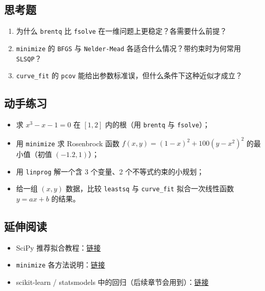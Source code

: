 \subsection{思考题}\label{ux601dux8003ux9898-10}

\begin{enumerate}
\def\labelenumi{\arabic{enumi}.}
\tightlist
\item
  为什么 \texttt{brentq} 比 \texttt{fsolve}
  在一维问题上更稳定？各需要什么前提？
\item
  \texttt{minimize} 的 \texttt{BFGS} 与 \texttt{Nelder-Mead}
  各适合什么情况？带约束时为何常用 \texttt{SLSQP}？
\item
  \texttt{curve\_fit} 的 \texttt{pcov}
  能给出参数标准误，但什么条件下这种近似才成立？
\end{enumerate}

\subsection{动手练习}\label{ux52a8ux624bux7ec3ux4e60-1}

\begin{itemize}
\tightlist
\item
  求 \(x^3-x-1=0\) 在 \([1,2]\) 内的根（用 \texttt{brentq} 与
  \texttt{fsolve}）；
\item
  用 \texttt{minimize} 求 Rosenbrock 函数
  \(f(x,y)=(1-x)^2+100(y-x^2)^2\) 的最小值（初值 \((-1.2,1)\)）；
\item
  用 \texttt{linprog} 解一个含 3 个变量、2 个不等式约束的小规划；
\item
  给一组 \((x,y)\) 数据，比较 \texttt{leastsq} 与 \texttt{curve\_fit}
  拟合一次线性函数 \(y=ax+b\) 的结果。
\end{itemize}

\subsection{延伸阅读}\label{ux5ef6ux4f38ux9605ux8bfb-11}

\begin{itemize}
\tightlist
\item
  SciPy
  推荐拟合教程：\href{https://scipy.github.io/old-wiki/pages/Cookbook/OptimizationAndFitDemo1.html}{链接}
\item
  \texttt{minimize}
  各方法说明：\href{https://docs.scipy.org/doc/scipy/reference/generated/scipy.optimize.minimize.html}{链接}
\item
  scikit-learn / statsmodels
  中的回归（后续章节会用到）：\href{https://www.statsmodels.org/stable/regression.html}{链接}
\end{itemize}

